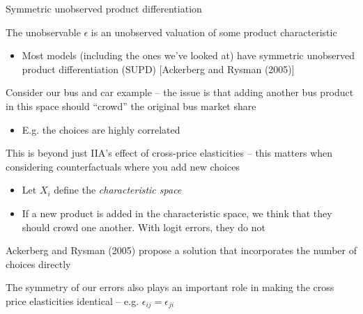 \documentclass[notes,11pt, aspectratio=169]{beamer}
\newenvironment{wideitemize}{\itemize\addtolength{\itemsep}{10pt}}{\enditemize}
\begin{document}
\begin{frame}{Symmetric unobserved product differentiation}
  \begin{wideitemize}
  \item The unobservable $\epsilon$ is an unobserved valuation of some
    product characteristic
    \begin{itemize}
    \item Most models (including the ones we've looked at) have
      symmetric unobserved product differentiation (SUPD) [Ackerberg and Rysman (2005)]
    \end{itemize}
  \item Consider our bus and car example -- the issue is that adding
    another bus product in this space should ``crowd'' the original bus market share
    \begin{itemize}
    \item E.g. the choices are highly correlated
    \end{itemize}
  \item This is beyond just IIA's effect of cross-price elasticities
    -- this matters when considering counterfactuals where you add new
    choices
    \begin{itemize}
    \item Let $X_{i}$ define the \emph{characteristic space}
    \item If a new product is added in the
      characteristic space, we think that they should crowd one
      another. With logit errors, they do not
    \end{itemize}
  \item Ackerberg and Rysman (2005) propose a solution that
    incorporates the number of choices directly
  \item The symmetry of our errors also plays an important role in
    making the cross price elasticities identical --
    e.g. $\epsilon_{ij} = \epsilon_{ji}$
  \end{wideitemize}
\end{frame}
\end{document}

